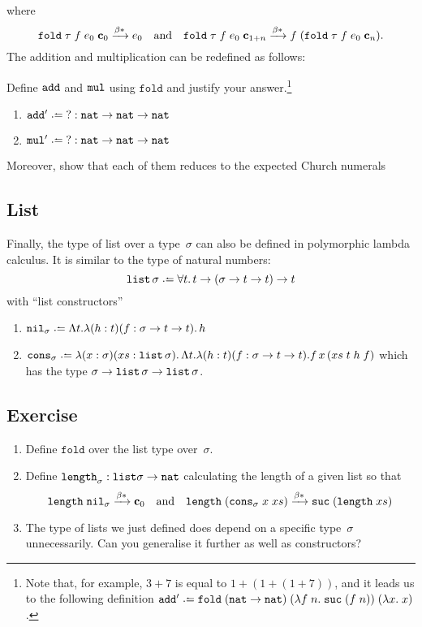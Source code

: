 where
\[
  \mathtt{fold}\;\tau\;f\;e_0\;\mathbf{c}_0 \xrightarrow{\beta*} e_0
  \quad\text{and}\quad\mathtt{fold}\;\tau\;f\;e_0\;\mathbf{c}_{1 + n} \xrightarrow{\beta*}
  f\;(\mathtt{fold}\;\tau\;f\;e_0\;\mathbf{c}_n).
\]
The addition and multiplication can be redefined as follows:
\begin{example}
  Define $\mathtt{add}$ and $\mathtt{mul}$ using $\mathtt{fold}$ and justify your
  answer.\footnote{
    Note that, for example, $3 + 7$ is equal to $1 + (1 + (1 + 7))$, and it
    leads us to the following definition
    $\add'\defeq \mathtt{fold}\;(\nat \to \nat)\;(\lambda
    f\;n.\;\suc\;(f\;n))\;(\lambda x.\;x)$. 
  }
  \begin{enumerate}
    \item $\add'\defeq \;? : \nat\to\nat\to\nat$
    \item $\mul'\defeq \;? : \nat\to\nat\to\nat$
  \end{enumerate}
  Moreover, show that each of them reduces to the expected Church numerals
\end{example}
\subsection{List}
Finally, the type of list over a type~$\sigma$ can also be defined in
polymorphic lambda calculus. It is similar to the type of natural numbers:
\[
  \List\,\sigma\defeq \forall t.\, t \to (\sigma \to t \to t) \to t 
\]
with ``list constructors'' 
\begin{enumerate}
  \item $\mathtt{nil}_\sigma \defeq \Lambda t.\lambda (h : t)(f :
    \sigma\to t \to t).\, h$
  \item $\mathtt{cons}_\sigma \defeq \lambda (x : \sigma)(xs : \List\,
    \sigma).\,\Lambda t.\lambda(h : t)(f : \sigma\to t \to t).f\,x\,(xs\; t\;
    h\; f)$ which has the type $\sigma \to \mathtt{list}\,\sigma \to  \mathtt{list}\,\sigma$.
  \end{enumerate}
\subsection*{Exercise}
\begin{enumerate}
  \item Define $\mathtt{fold}$ over the list type over~$\sigma$.
  \item Define $\mathtt{length}_{\sigma} : \mathtt{list} \sigma \to \mathtt{nat}$ calculating
    the length of a given list so that
    \[
      \mathtt{length}\;\mathtt{nil}_\sigma \xrightarrow{\beta*} \mathbf{c}_0
      \quad\text{and}\quad
      \mathtt{length}\;(\mathtt{cons}_\sigma\;x\;xs)
      \xrightarrow{\beta*} \mathtt{suc}\;(\mathtt{length}\;xs) 
    \]
  \item The type of lists we just defined does depend on a specific
    type~$\sigma$ unnecessarily. Can you generalise it further as well as
    constructors?
  \end{enumerate}

